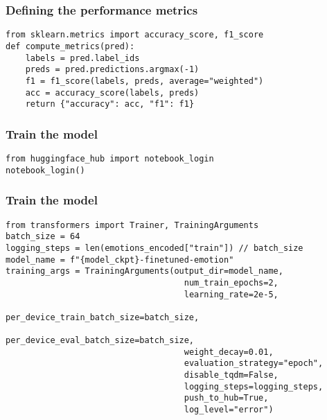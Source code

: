 \begin{frame}[fragile]\frametitle{Defining the performance metrics}

\begin{lstlisting}
from sklearn.metrics import accuracy_score, f1_score
def compute_metrics(pred):
	labels = pred.label_ids
	preds = pred.predictions.argmax(-1)
	f1 = f1_score(labels, preds, average="weighted")
	acc = accuracy_score(labels, preds)
	return {"accuracy": acc, "f1": f1}
\end{lstlisting}
			
			
\end{frame}

\begin{frame}[fragile]\frametitle{Train the model}

\begin{lstlisting}
from huggingface_hub import notebook_login
notebook_login()
\end{lstlisting}
			
			
\end{frame}

\begin{frame}[fragile]\frametitle{Train the model}

\begin{lstlisting}
from transformers import Trainer, TrainingArguments
batch_size = 64
logging_steps = len(emotions_encoded["train"]) // batch_size
model_name = f"{model_ckpt}-finetuned-emotion"
training_args = TrainingArguments(output_dir=model_name,
									num_train_epochs=2,
									learning_rate=2e-5,
									per_device_train_batch_size=batch_size,
									per_device_eval_batch_size=batch_size,
									weight_decay=0.01,
									evaluation_strategy="epoch",
									disable_tqdm=False,
									logging_steps=logging_steps,
									push_to_hub=True, 
									log_level="error")
\end{lstlisting}
			
			
\end{frame}

